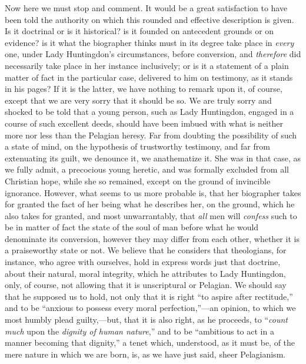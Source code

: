 Now here we must stop and comment. It would be a
great satisfaction to have been told the authority on which this
rounded and effective description is given. Is it doctrinal or is it
historical? is it founded on antecedent grounds or on evidence? is it
what the biographer thinks must in its degree take place in \emph{every}
one, under Lady Huntingdon's circumstances, before conversion, and \emph{therefore}
did necessarily take place in her instance inclusively; or is it a
statement of a plain matter of fact in the particular case, delivered
to him on testimony, as it stands in his pages? If it is the latter,
we have nothing to remark upon it, of course, except that we are
very sorry that it should be so. We are truly sorry and shocked to be
told that a young person, such as Lady Huntingdon, engaged in a course
of such excellent deeds, should have been imbued with what is neither
more nor less than the Pelagian heresy. Far from doubting the
possibility of such a state of mind, on the hypothesis of trustworthy
testimony, and far from extenuating its guilt, we denounce it, we
anathematize it. She was in that case, as we fully admit, a precocious
young heretic, and was formally excluded from all Christian hope,
while she so remained, except on the ground of invincible ignorance.
However, what seems to us more probable is, that her biographer takes
for granted the fact of her being what he describes her, on the
ground, which he also takes for granted, and most unwarrantably, that \emph{all}
men will \emph{confess} such to be in matter of fact the state of the
soul of man before what he would denominate its conversion, however
they may differ from each other, whether it is a praiseworthy state or
not. We believe that he considers that theologians, for instance, who
agree with ourselves, hold in express words just that doctrine, about
their natural, moral integrity, which he attributes to Lady
Huntingdon, only, of course, not allowing that it is unscriptural or
Pelagian. We should say that he supposed us to hold, not only that it
is right ``to aspire after rectitude,'' and to be ``anxious to possess
every moral perfection,''—an opinion, to which we most humbly plead
guilty,—but, that it is also right, as he proceeds, to ``\emph{count
much} upon the \emph{dignity of human nature},'' and to be ``ambitious
to act in a manner becoming that dignity,'' a tenet which, understood,
as it must be, of the mere nature in which we are born, is, as we have
just said, sheer Pelagianism.

